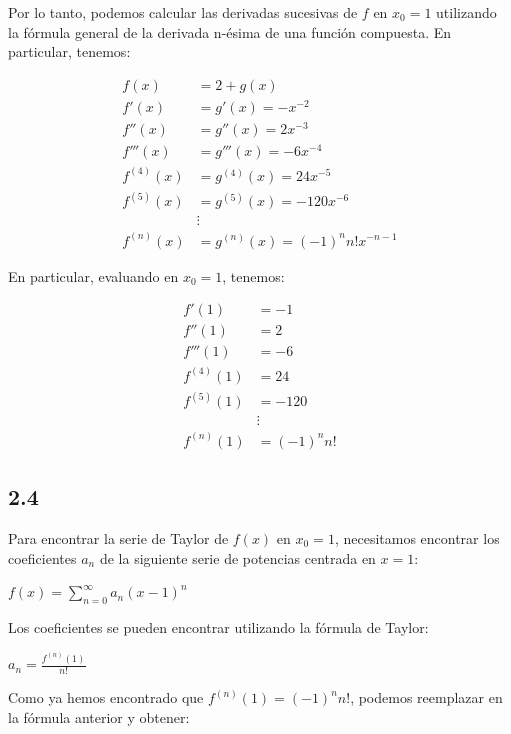 \documentclass[12pt]{article}
\begin{document}
      Por lo tanto, podemos calcular las derivadas sucesivas de $f$ en $x_0=1$ utilizando la fórmula general de la derivada n-ésima de una función compuesta. En particular, tenemos:
      
      \begin{align*}
        f(x) &= 2+g(x) \\
        f'(x) &= g'(x) = -x^{-2} \\
        f''(x) &= g''(x) = 2x^{-3} \\
        f'''(x) &= g'''(x) = -6x^{-4} \\
        f^{(4)}(x) &= g^{(4)}(x) = 24x^{-5} \\
        f^{(5)}(x) &= g^{(5)}(x) = -120x^{-6} \\
        &\vdots \\
        f^{(n)}(x) &= g^{(n)}(x) = (-1)^n n! x^{-n-1}
        \end{align*}
        
        En particular, evaluando en $x_0=1$, tenemos:
        
        \begin{align}
          f'(1) &= -1 \\
          f''(1) &= 2 \\
          f'''(1) &= -6 \\
          f^{(4)}(1) &= 24 \\
          f^{(5)}(1) &= -120 \\
          &\vdots \\
          f^{(n)}(1) &= (-1)^{n}n!
        \end{align}

      \subsection{2.4}
        
        Para encontrar la serie de Taylor de $f(x)$ en $x_0=1$, necesitamos encontrar los coeficientes $a_n$ de la siguiente serie de potencias centrada en $x=1$:

        $f(x) = \sum_{n=0}^{\infty} a_n (x-1)^n$
        
        Los coeficientes se pueden encontrar utilizando la fórmula de Taylor:
        
        $a_n = \frac{f^{(n)}(1)}{n!}$
        
        Como ya hemos encontrado que $f^{(n)}(1) = (-1)^n n!$, podemos reemplazar en la fórmula anterior y obtener:
        
\end{document}
